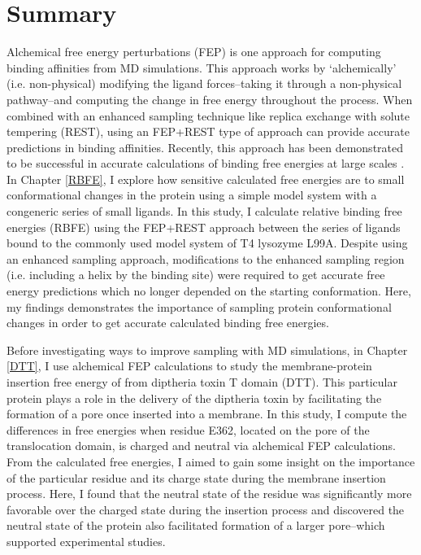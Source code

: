 \section*{Summary}
Alchemical free energy perturbations (FEP) is one approach for computing binding affinities from MD simulations.
This approach works by `alchemically' (i.e. non-physical) modifying the ligand forces--taking it through a non-physical pathway--and computing the change in free energy throughout the process.
When combined with an enhanced sampling technique like replica exchange with solute tempering (REST), using an FEP+REST type of approach can provide accurate predictions in binding affinities.
Recently, this approach has been demonstrated to be successful in accurate calculations of binding free energies at large scales \cite{FEPplus}.
In Chapter \ref{RBFE}, I explore how sensitive calculated free energies are to small conformational changes in the protein using a simple model system with a congeneric series of small ligands.
In this study, I calculate relative binding free energies (RBFE) using the FEP+REST approach between the series of ligands bound to the commonly used model system of T4 lysozyme L99A.
Despite using an enhanced sampling approach, modifications to the enhanced sampling region (i.e. including a helix by the binding site) were required to get accurate free energy predictions which no longer depended on the starting conformation.
Here, my findings demonstrates the importance of sampling protein conformational changes in order to get accurate calculated binding free energies.

Before investigating ways to improve sampling with MD simulations, in Chapter \ref{DTT}, I use alchemical FEP calculations to study the membrane-protein insertion free energy of from diptheria toxin T domain (DTT).
This particular protein plays a role in the delivery of the diptheria toxin by facilitating the formation of a pore once inserted into a membrane.
In this study, I compute the differences in free energies when residue E362, located on the pore of the translocation domain, is charged and neutral via alchemical FEP calculations.
From the calculated free energies, I aimed to gain some insight on the importance of the particular residue and its charge state during the membrane insertion process.
Here, I found that the neutral state of the residue was significantly more favorable over the charged state during the insertion process and discovered the neutral state of the protein also facilitated formation of a larger pore--which supported experimental studies.

